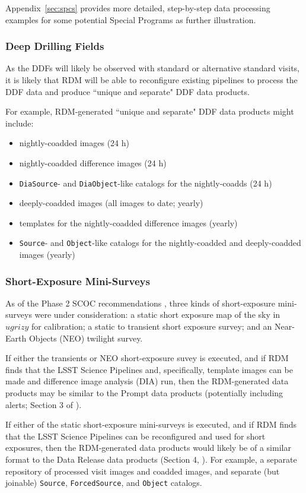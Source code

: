 Appendix~\ref{sec:spcs} provides more detailed, step-by-step data processing 
examples for some potential Special Programs as further illustration. 


\subsubsection{Deep Drilling Fields}

As the DDFs will likely be observed with standard or alternative standard 
visits, it is likely that RDM will be able to reconfigure existing pipelines 
to process the DDF data and produce ``unique and separate" DDF data products.

For example, RDM-generated ``unique and separate" DDF data products might 
include:
\begin{itemize}
\item nightly-coadded images (24 h)
\item nightly-coadded difference images (24 h)
\item {\tt DiaSource}- and {\tt DiaObject}-like catalogs for the nightly-coadds (24 h)
\item deeply-coadded images (all images to date; yearly)
\item templates for the nightly-coadded difference images (yearly)
\item {\tt Source}- and {\tt Object}-like catalogs for the nightly-coadded and deeply-coadded images (yearly)
\end{itemize}


\subsubsection{Short-Exposure Mini-Surveys}

As of the Phase 2 SCOC recommendations , three kinds of 
short-exposure mini-surveys were under consideration: 
a static short exposure map of the sky in $ugrizy$ for calibration; 
a static to transient short exposure survey; and 
an Near-Earth Objects (NEO) twilight survey.

If either the transients or NEO short-exposure suvey is executed, and if 
RDM finds that the LSST Science Pipelines and, specifically, template images 
can be made and difference image analysis (DIA) run, then the RDM-generated 
data products may be similar to the Prompt data products (potentially 
including alerts; Section 3 of ).

If either of the static short-exposure mini-surveys is executed, and if 
RDM finds that the LSST Science Pipelines can be reconfigured and used 
for short exposures, then the RDM-generated data products would likely be 
of a similar format to the Data Release data products 
(Section 4, ).
For example, a separate repository of processed visit images and coadded 
images, and separate (but joinable) {\tt Source}, {\tt ForcedSource}, and 
{\tt Object} catalogs.


